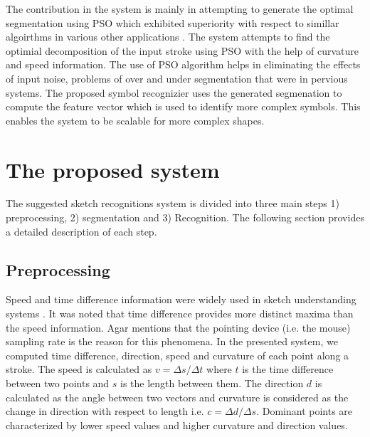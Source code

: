 \documentclass{article}
\begin{document}
The contribution in the system is mainly in attempting to generate the optimal segmentation using PSO which exhibited superiority with respect to simillar algoirthms in various other applications \cite{PolygonApproximationPSO}. The system attempts to find the optimial decomposition of the input stroke using PSO with the help of curvature and speed information. The use of PSO algorithm helps in eliminating the effects of input noise, problems of over and under segmentation that were in pervious systems. The proposed symbol recognizier uses the generated segmenation to compute the feature vector which is used to identify more complex symbols. This enables the system to be scalable for more  complex shapes. 

 
\section{The proposed system}
\label{Sysdisc}
 The suggested sketch recognitions system is divided into three main steps 1) preprocessing, 2) segmentation and 3) Recognition. The following section provides a detailed description of each step.
\subsection{Preprocessing}
\label{Prepross}
 Speed and time difference information were widely used in sketch understanding systems \cite{earlyprocess}. It was noted that time difference provides more distinct maxima than the speed information. Agar \cite{polygonfeedback31} mentions that the pointing device (i.e. the mouse) sampling rate is the reason for this phenomena. 
 In the presented system, we computed time difference, direction, speed and curvature of each point along a stroke. The speed is calculated as $v=\Delta s/\Delta t$ where $t$ is the time difference between two points and $s$ is the length between them. The direction $d$ is calculated as the angle between two vectors and curvature is considered as the change in direction with respect to length i.e. $c= \Delta d/\Delta s$.  Dominant points are characterized by lower speed values and higher curvature and direction values.
  
\end{document}
